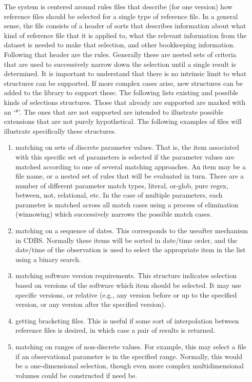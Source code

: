 \documentclass[final,authoryear,5p,times,twocolumn]{elsarticle}
\begin{document}
The system is centered around rules files that describe (for one version) 
how reference files should be selected for a single type of
reference file. In a general sense, the file consists of a header of sorts that
describes information about what kind of reference file that it is applied to,
what the relevant information from the dataset is needed to make that
selection, and other bookkeeping information. Following that header are the
rules. Generally these are nested sets of criteria that are used to
successively narrow down the selection until a single result is determined. It
is important to understand that there is no intrinsic limit to what structures
can be supported. If more complex cases arise, new structures can be added to
the library to support these. The following lists existing and possible kinds
of selections structures. Those that already are supported are marked with an
`*'. The ones that are not supported are intended to illustrate possible
extensions that are not purely hypothetical. The following examples of files
will illustrate specifically these structures.

\begin{enumerate}
\item matching on sets of discrete parameter values. That is, the item associated
with this specific set of parameters is selected if the parameter values are
matched according to one of several matching approaches. An item may be a file
name, or a nested set of rules that will be evaluated in turn.  
There are a number of different parameter match types, literal, or-glob,
pure regex, between, not, relational, etc.  In the case of multiple parameters,
each parameter is matched across all match cases using a process of elimination
(winnowing) which successively narrows the possible match cases.

\item matching on a sequence of dates. This corresponds to the useafter mechanism
in CDBS. Normally these items will be sorted in date/time order, and the
date/time of the observation is used to select the appropriate item in the list
using a binary search.

\item matching software version requirements. This structure indicates selection
based on versions of the software which item should be selected. It may use
specific versions, or relative (e.g., any version before or up to the specified
version, or any version after the specified version).

\item getting bracketing files. This is useful if some sort of interpolation
between reference files is desired, in which case a pair of results is
returned.

\item matching on ranges of non-discrete values. For example, this may select a
file if an observational parameter is in the specified range. Normally, this
would be a one-dimensional selection, though even more complex multidimensional
volumes could be constructed if need be.
\end{enumerate}
\end{document}
